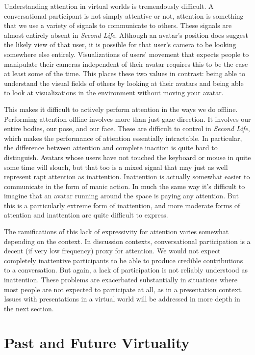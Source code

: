 Understanding attention in virtual worlds is tremendously difficult. A conversational participant is not simply attentive or not, attention is something that we use a variety of signals to communicate to others. These signals are almost entirely absent in \emph{Second Life}. Although an avatar's position does suggest the likely view of that user, it is possible for that user's camera to be looking somewhere else entirely. Visualizations of users' movement that expects people to manipulate their cameras independent of their avatar requires this to be the case at least some of the time. This places these two values in contrast: being able to understand the visual fields of others by looking at their avatars and being able to look at visualizations in the environment without moving your avatar. 

This makes it difficult to actively perform attention in the ways we do offline. Performing attention offline involves more than just gaze direction. It involves our entire bodies, our pose, and our face. These are difficult to control in \emph{Second Life}, which makes the performance of attention essentially intractable. In particular, the difference between attention and complete inaction is quite hard to distinguish. Avatars whose users have not touched the keyboard or mouse in quite some time will slouch, but that too is a mixed signal that may just as well represent rapt attention as inattention. Inattention is actually somewhat easier to communicate in the form of manic action. In much the same way it's difficult to imagine that an avatar running around the space is paying any attention. But this is a particularly extreme form of inattention, and more moderate forms of attention and inattention are quite difficult to express.

The ramifications of this lack of expressivity for attention varies somewhat depending on the context. In discussion contexts, conversational participation is a decent (if very low frequency) proxy for attention. We would not expect completely inattentive participants to be able to produce credible contributions to a conversation. But again, a lack of participation is not reliably understood as inattention. These problems are exacerbated substantially in situations where most people are not expected to participate at all, as in a presentation context. Issues with presentations in a virtual world will be addressed in more depth in the next section.

\section{Past and Future Virtuality}

